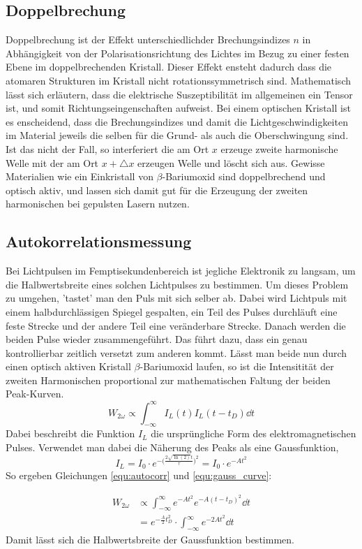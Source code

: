 \subsection{Doppelbrechung}
Doppelbrechung ist der Effekt unterschiedlichder Brechungsindizes $n$ in Abhängigkeit von
der Polarisationsrichtung des Lichtes im Bezug zu einer festen Ebene im doppelbrechenden Kristall. Dieser Effekt ensteht dadurch dass die atomaren Strukturen im Kristall nicht rotationssymmetrisch sind. Mathematisch
lässt sich erläutern, dass die elektrische Suszeptibilität im allgemeinen ein Tensor ist, und somit Richtungseingenschaften aufweist. 
Bei einem optischen Kristall ist es enscheidend, dass die Brechungsindizes und damit die Lichtgeschwindigkeiten
im Material jeweils die selben für die Grund- als auch die Oberschwingung sind. Ist das nicht der Fall,
so interferiert die am Ort $x$ erzeuge zweite harmonische Welle mit der am Ort $x + \triangle x$ erzeugen Welle und löscht sich aus.
Gewisse Materialien wie ein Einkristall von $\beta$-Bariumoxid sind doppelbrechend und optisch aktiv,
und lassen sich damit gut für die Erzeugung der zweiten harmonischen bei gepulsten Lasern nutzen.

\subsection{Autokorrelationsmessung}
Bei Lichtpulsen im Femptisekundenbereich ist jegliche Elektronik zu langsam, um die Halbwertsbreite
eines solchen Lichtpulses zu bestimmen. Um dieses Problem zu umgehen, 'tastet' man den Puls mit sich selber ab.
Dabei wird Lichtpuls mit einem halbdurchlässigen Spiegel gespalten, ein Teil des Pulses durchläuft eine feste Strecke und der andere Teil eine veränderbare Strecke. Danach werden die beiden Pulse wieder zusammengeführt.
Das führt dazu, dass ein genau kontrollierbar zeitlich versetzt zum anderen kommt.
Lässt man beide nun durch einen optisch aktiven Kristall $\beta$-Bariumoxid laufen, so ist die Intensitität der zweiten Harmonischen proportional zur mathematischen Faltung der beiden Peak-Kurven.
\begin{equation}
  W_{2\omega} \propto \int_{-\infty}^{\infty}{I_L(t)I_L(t-t_D)\dd{t}}
  \label{equ:autocorr}
\end{equation}
Dabei beschreibt die Funktion $I_L$ die ursprüngliche Form des elektromagnetischen Pulses.
Verwendet man dabei die Näherung des Peaks als eine Gaussfunktion,
\begin{equation}
  I_L = I_0 \cdot e^{-\big(\frac{2\sqrt{\ln(2)}t}{\tau}\big)^2} = I_0 \cdot e^{-At^2}
  \label{equ:gauss_curve}
\end{equation}
So ergeben Gleichungen \ref{equ:autocorr} und \ref{equ:gauss_curve}:

\begin{align*}
  W_{2\omega} & \propto \int_{-\infty}^{\infty} e^{-At^2} e^{-A(t-t_D)^2} \dd{t} \\
  & = e^{-\frac{A}{2} t_D^2} \cdot \int_{-\infty}^{\infty} e^{-2At^2} \dd{t}
\end{align*}
Damit lässt sich die Halbwertsbreite der Gaussfunktion bestimmen.


